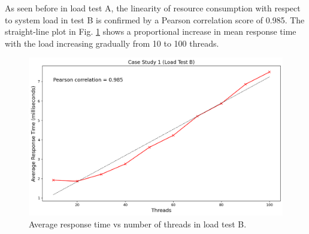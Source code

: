 As seen before in load test A, the linearity of resource consumption with respect to system load in test B is confirmed by a Pearson correlation score of 0.985. The straight-line plot in Fig. \ref{fig:cs01-ltb-4} shows a proportional increase in mean response time with the load increasing gradually from 10 to 100 threads.

\begin{figure}[H]
  \centering
  \includegraphics[width=0.8\linewidth]{./assets/images/case-study-01/cs01-ltb-4.png}
  \caption{Average response time vs number of threads in load test B.}
  \label{fig:cs01-ltb-4}
\end{figure}